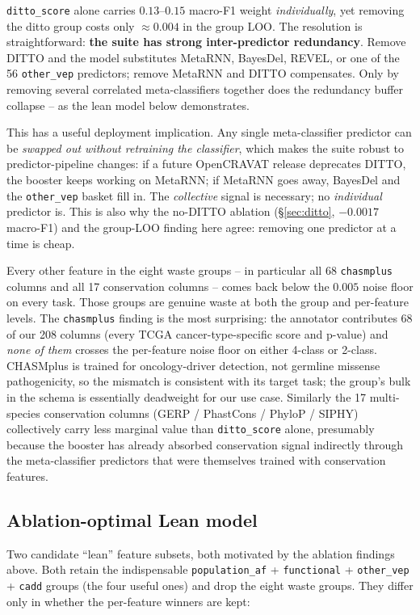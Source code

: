 \documentclass[11pt,a4paper]{article}
\begin{document}
\texttt{ditto\_score} alone carries $0.13$--$0.15$ macro-F1 weight
\emph{individually}, yet removing the ditto group costs only
$\approx 0.004$ in the group LOO. The resolution is straightforward:
\textbf{the suite has strong inter-predictor redundancy}. Remove DITTO and
the model substitutes MetaRNN, BayesDel, REVEL, or one of the 56
\texttt{other\_vep} predictors; remove MetaRNN and DITTO compensates.
Only by removing several correlated meta-classifiers together does the
redundancy buffer collapse -- as the lean model below demonstrates.

This has a useful deployment implication. Any single meta-classifier
predictor can be \emph{swapped out without retraining the classifier},
which makes the suite robust to predictor-pipeline changes: if a future
OpenCRAVAT release deprecates DITTO, the booster keeps working on
MetaRNN; if MetaRNN goes away, BayesDel and the \texttt{other\_vep}
basket fill in. The \emph{collective} signal is necessary; no
\emph{individual} predictor is. This is also why the no-DITTO ablation
(\S\ref{sec:ditto}, $-0.0017$ macro-F1) and the group-LOO finding here
agree: removing one predictor at a time is cheap.

Every other feature in the eight waste groups -- in particular all 68
\texttt{chasmplus} columns and all 17 conservation columns -- comes
back below the $0.005$ noise floor on every task. Those groups are
genuine waste at both the group and per-feature levels. The
\texttt{chasmplus} finding is the most surprising: the annotator
contributes 68 of our 208 columns (every TCGA cancer-type-specific
score and p-value) and \emph{none of them} crosses the per-feature
noise floor on either 4-class or 2-class. CHASMplus is trained for
oncology-driver detection, not germline missense pathogenicity, so the
mismatch is consistent with its target task; the group's bulk in the
schema is essentially deadweight for our use case. Similarly the 17
multi-species conservation columns (GERP / PhastCons / PhyloP / SIPHY)
collectively carry less marginal value than \texttt{ditto\_score}
alone, presumably because the booster has already absorbed conservation
signal indirectly through the meta-classifier predictors that were
themselves trained with conservation features.

\subsection{Ablation-optimal Lean model}
\label{sec:lean}

Two candidate ``lean'' feature subsets, both motivated by the ablation
findings above. Both retain the indispensable
\texttt{population\_af} + \texttt{functional} + \texttt{other\_vep} +
\texttt{cadd} groups (the four useful ones) and drop the eight waste
groups. They differ only in whether the per-feature winners are kept:
\end{document}
